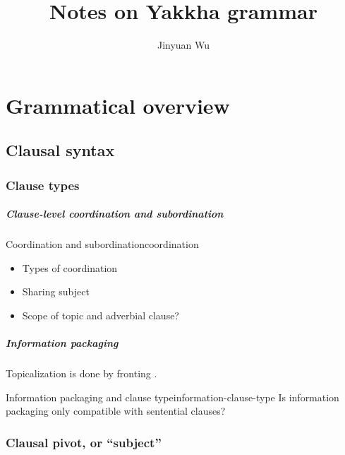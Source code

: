 \documentclass[a4paper, oneside, 12pt]{report}
\title{Notes on Yakkha grammar}
\author{Jinyuan Wu}
\newcommand*{\citepage}[1]{p.~{#1}}
\begin{document}
\maketitle

\chapter{Grammatical overview}

\section{Clausal syntax}

\subsection{Clause types}

\paragraph*{Clause-level coordination and subordination}
\begin{todobox}{Coordination and subordination}{coordination}
    \begin{itemize}
        \item Types of coordination
        \item Sharing subject
        \item Scope of topic and adverbial clause?
    \end{itemize}
\end{todobox}

\paragraph*{Information packaging}
Topicalization is done by fronting \citep[\citepage{387}]{schackow2015grammar}.

\begin{todobox}{Information packaging and clause type}{information-clause-type}
    Is information packaging only compatible with sentential clauses?
\end{todobox}

\subsection{Clausal pivot, or ``subject''} 
\end{document}
